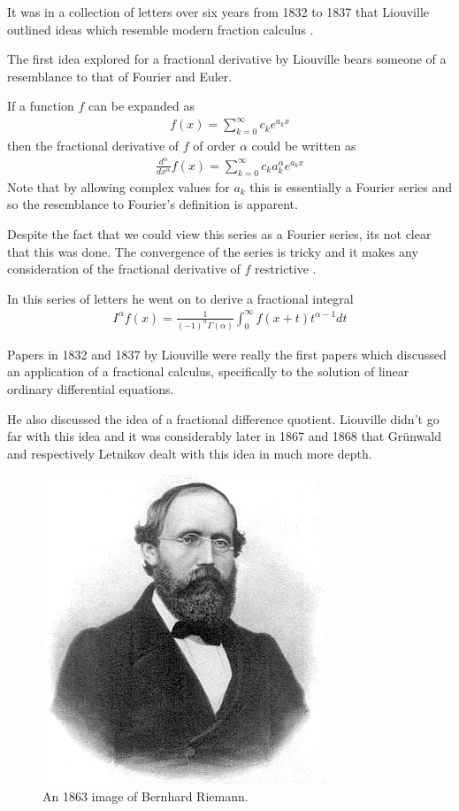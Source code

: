 It was in a collection of letters over six years from 1832 to 1837 that Liouville outlined ideas which resemble modern fraction calculus \cite{Samko1993}. 

The first idea explored for a fractional derivative by Liouville bears someone of a resemblance to that of Fourier and Euler. 

If a function $ f $ can be expanded as 
\begin{align*}
	f(x) = \sum_{k=0}^\infty c_k e^{a_kx}
\end{align*}
then the fractional derivative of $ f $ of order $ \alpha $ could be written as
\begin{align*}
	\frac{d^\alpha}{dx^\alpha} f(x) = \sum_{k=0}^\infty c_k a_k^\alpha e^{a_k x}
\end{align*}
Note that by allowing complex values for $ a_k $ this is essentially a Fourier series and so the resemblance to Fourier's definition is apparent.

Despite the fact that we could view this series as a Fourier series, its not clear that this was done. The convergence of the series is tricky and it makes any consideration of the fractional derivative of $ f $ restrictive \cite{Samko1993}.

In this series of letters he went on to derive a fractional integral
\begin{align*}
	I^\alpha f(x) = \frac{1}{(-1)^\alpha \Gamma(\alpha)} \int_0^\infty f(x + t)t^{\alpha - 1} dt
\end{align*}

Papers in 1832 and 1837 by Liouville were really the first papers which discussed an application of a fractional calculus, specifically to the solution of linear ordinary differential equations. 

He also discussed the idea of a fractional difference quotient.
Liouville didn't go far with this idea and it was considerably later in 1867 and 1868 that Gr{\"u}nwald and respectively Letnikov dealt with this idea in much more depth. 
 
\begin{figure}
    \includegraphics[scale=0.6]{images/Georg_Friedrich_Bernhard_Riemann}
    \caption{An 1863 image of Bernhard Riemann.}
\end{figure}

